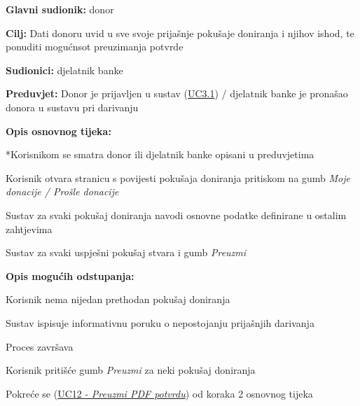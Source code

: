 					
					\noindent {}
					\begin{packed_item} \label{UC11}
	
						\item \textbf{Glavni sudionik: }donor
						\item  \textbf{Cilj:} Dati donoru uvid u sve svoje prijašnje pokušaje doniranja i njihov ishod, te ponuditi mogućnsot preuzimanja potvrde
						\item  \textbf{Sudionici:} djelatnik banke
						\item  \textbf{Preduvjet:} Donor je prijavljen u sustav (\hyperref[UC3.1]{UC3.1}) / djelatnik banke je pronašao donora u sustavu pri darivanju
						\item  \textbf{Opis osnovnog tijeka:}
						
						*Korisnikom se smatra donor ili djelatnik banke opisani u preduvjetima
						\item[] \begin{packed_enum}
							\item Korisnik otvara stranicu s povijesti pokušaja doniranja pritiskom na gumb \textit{Moje donacije / Prošle donacije}
	                        \item Sustav za svaki pokušaj doniranja navodi osnovne podatke definirane u ostalim zahtjevima
	                        \item Sustav za svaki uspješni pokušaj stvara i gumb \textit{Preuzmi}
						\end{packed_enum}
						
						\item  \textbf{Opis mogućih odstupanja:}
						
						\item[] \begin{packed_item}
	
							\item[2] Korisnik nema nijedan prethodan pokušaj doniranja
							\item[] \begin{packed_enum}
								\item Sustav ispisuje informativnu poruku o nepostojanju prijašnjih darivanja
								\item Proces završava
							\end{packed_enum}
							
							\item[3] Korisnik pritišće gumb \textit{Preuzmi} za neki pokušaj doniranja
							\item[] \begin{packed_enum}
							    \item Pokreće se (\hyperref[UC12]{UC12 - \textit{Preuzmi PDF potvrdu}}) od koraka 2 osnovnog tijeka
							\end{packed_enum}

						\end{packed_item}
						
					\end{packed_item}
					
